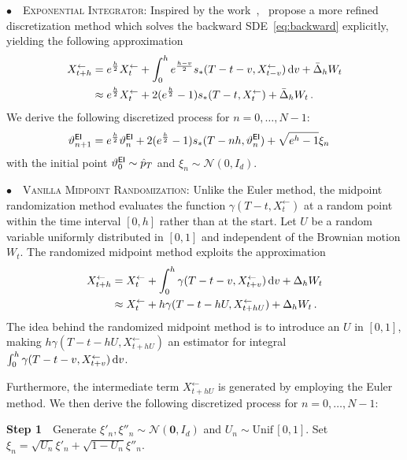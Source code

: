 \documentclass[11pt]{article}
\def\rmd{{\,\rm d}}
\begin{document}
\noindent $\bullet$~~\textsc{Exponential Integrator}:\quad
Inspired by the work~\cite{hochbruck2010exponential},~\cite{zhang2022fast} propose a more refined discretization method which solves the backward SDE~\eqref{eq:backward} explicitly, yielding the following approximation 
\begin{align*}
X^{\leftarrow}_{t+h}&=e^\frac{h}{2}X^{\leftarrow}_t+\int_0^h e^{\frac{h-v}{2}}   s_*(T-t-v,X^{\leftarrow}_{t-v})\rmd v+\bar{\Delta}_hW_t\\
&\approx e^{\frac{h}{2}}X^{\leftarrow}_t+ 2(e^{\frac{h}{2}}-1) s_*(T-t,X^{\leftarrow}_t)
+\bar{\Delta}_hW_t\,.
\end{align*}
We derive the following discretized process for $n=0,\dots,N-1$:
\begin{align*}
\vartheta^{\sf EI}_{n+1}&=e^{\frac{h}{2}}\vartheta^{\sf EI}_{n}
+2(e^{\frac{h}{2}}-1)s_*(T-nh,\vartheta^{\sf EI}_n)+\sqrt{e^h-1}\xi_n
\end{align*}
with the initial point $\vartheta^{\sf EI}_{0}\sim \hat p_T$ and $\xi_n\sim \mathcal{N}(0,I_{d}).$

\noindent $\bullet$~~\textsc{Vanilla Midpoint Randomization}:\quad
Unlike the Euler method, the midpoint randomization method evaluates the function $\gamma(T-t,X_t^{\leftarrow})$ at a random point within the time interval $[0,h]$ rather than at the start.
Let $U$ be a random variable uniformly distributed in $[0, 1]$ and independent of the Brownian motion $W_t$. The randomized midpoint method exploits the approximation
\begin{align}
X^{\leftarrow}_{t+h}
&=X^{\leftarrow}_t+\int_0^h \gamma(T-t-v, X^{\leftarrow}_{t+v})\rmd v+\Delta_hW_t\nonumber\\
&\approx X_t^{\leftarrow}+ h \gamma(T-t-hU,X^{\leftarrow}_{t+hU})
+ \Delta_hW_t\,.
\label{eq:mr}
\end{align}
The idea behind the randomized midpoint method is to introduce an $U$ in $[0,1]$,
making $h\gamma(T-t-hU,X^{\leftarrow}_{t+hU})$ an estimator for integral $\int_0^h\gamma(T-t-v,X^{\leftarrow}_{t+v})\rmd v$. 

Furthermore, the intermediate term $X^{\leftarrow}_{t+hU}$ is generated by employing the Euler method.
We then derive the following discretized process for $n=0,\dots,N-1$:

\vspace{0.2cm}
\textbf{Step 1}\label{noise}~~Generate $\xi'_n,\xi''_n\sim \mathcal{N}(\mathbf{0},I_d)$ and $U_n\sim\text{Unif}\,[0,1]$. 
Set $\xi_n=\sqrt{U_n}\xi'_n+\sqrt{1-U_n}\xi''_n$.
\end{document}
